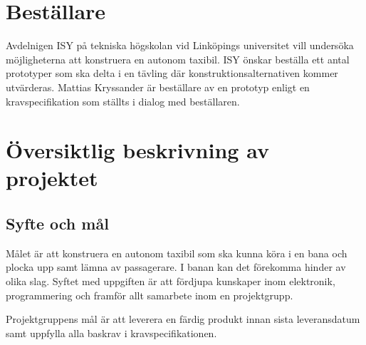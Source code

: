 \documentclass[projektplan/plan.tex]{subfiles}
\begin{document}
\section{Beställare}
Avdelnigen ISY på tekniska högskolan vid Linköpings universitet vill undersöka
möjligheterna att konstruera en autonom taxibil. ISY önskar beställa ett antal
prototyper som ska delta i en tävling där konstruktionsalternativen kommer
utvärderas. Mattias Kryssander är beställare av en prototyp enligt en
kravspecifikation som ställts i dialog med beställaren.

\section{Översiktlig beskrivning av projektet}
\subsection{Syfte och mål}
Målet är att konstruera en autonom taxibil som ska kunna köra i en bana och
plocka upp samt lämna av passagerare. I banan kan det förekomma hinder av olika
slag. Syftet med uppgiften är att fördjupa kunskaper inom elektronik,
programmering och framför allt samarbete inom en projektgrupp.

Projektgruppens mål är att leverera en färdig produkt innan sista leveransdatum
samt uppfylla alla baskrav i kravspecifikationen.
\end{document}
